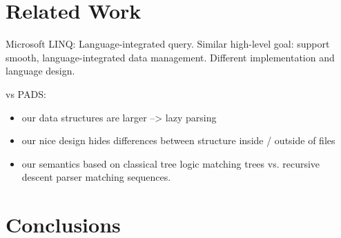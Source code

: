 \documentclass[nocopyrightspace,natbib]{sigplanconf}
\begin{document}





\section{Related Work}
\label{sec:related}

Microsoft LINQ: Language-integrated query.  Similar high-level goal:
support smooth, language-integrated data management.  Different 
implementation and language design.

vs PADS:  
\begin{itemize}
\item our data structures are larger --> lazy parsing
\item our nice design hides differences between structure inside /
outside of files
\item our semantics based on classical tree logic matching trees vs. 
recursive descent parser matching sequences.
\end{itemize}

\section{Conclusions}
\label{sec:conclusion}
\end{document}
